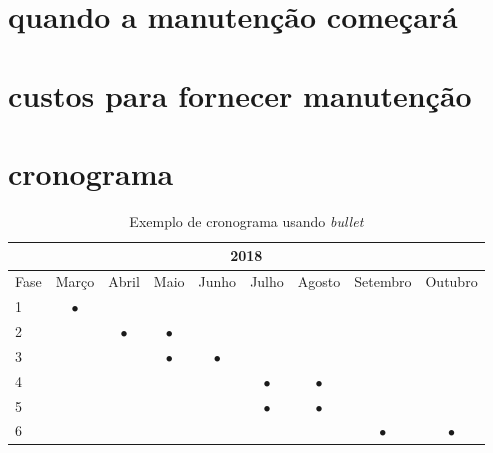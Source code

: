 \section{quando a manutenção começará}

\section{custos para fornecer manutenção}

\section{cronograma}
\begin{table}[!htb]
 \caption{Exemplo de cronograma usando \textit{bullet}}
 \label{tab:cronograma}
 \begin{center}
  \begin{tabular}{l||c|c|c|c|c|c|c|c}
    \hline
    \multicolumn{9}{c}{2018} \\ \hline \hline
    \multicolumn{1}{c||}{Fase} & Março     & Abril     & Maio     & Junho   & Julho & Agosto & Setembro & Outubro\\ \hline
    1    & $\bullet$ &           &          &         &  &  &  & \\
    2    &           & $\bullet$ & $\bullet$&         &  &  &  &\\
    3    &           &           & $\bullet$& $\bullet$ &  &  &  &\\
    4    &           &           &          &         &  $\bullet$& $\bullet$ &  &\\
    5    &           &           & & &  $\bullet$& $\bullet$ &  &\\
    6    &           &           & & &  &  &  $\bullet$&$\bullet$\\
    \hline
  \end{tabular}
 \vspace{8pt} %
 \end{center}
 \end{table}
